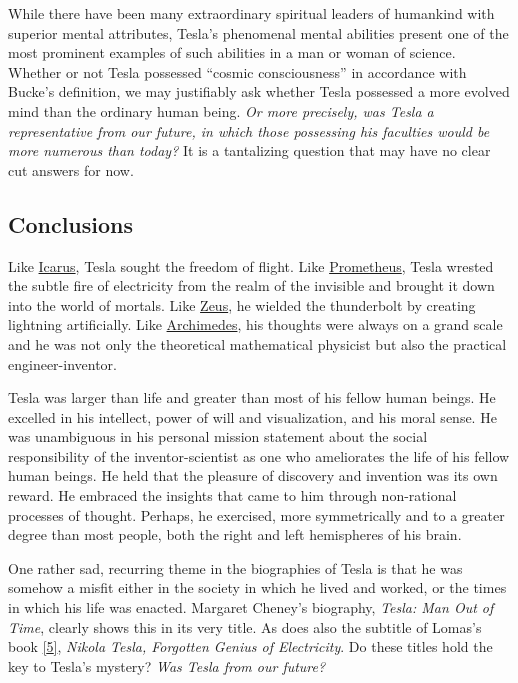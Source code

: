\documentclass[
  a4paper,
]{article}
\begin{document}
While there have been many extraordinary spiritual leaders of humankind
with superior mental attributes, Tesla's phenomenal mental abilities
present one of the most prominent examples of such abilities in a man or
woman of science. Whether or not Tesla possessed ``cosmic
consciousness'' in accordance with Bucke's definition, we may
justifiably ask whether Tesla possessed a more evolved mind than the
ordinary human being. \emph{Or more precisely, was Tesla a
representative from our future, in which those possessing his faculties
would be more numerous than today?} It is a tantalizing question that
may have no clear cut answers for now.

\hypertarget{conclusions}{%
\subsection{Conclusions}\label{conclusions}}

Like \href{https://en.wikipedia.org/wiki/Icarus}{Icarus}, Tesla sought
the freedom of flight. Like
\href{https://en.wikipedia.org/wiki/Prometheus}{Prometheus}, Tesla
wrested the subtle fire of electricity from the realm of the invisible
and brought it down into the world of mortals. Like
\href{https://en.wikipedia.org/wiki/Zeus}{Zeus}, he wielded the
thunderbolt by creating lightning artificially. Like
\href{https://en.wikipedia.org/wiki/Archimedes}{Archimedes}, his
thoughts were always on a grand scale and he was not only the
theoretical mathematical physicist but also the practical
engineer-inventor.

Tesla was larger than life and greater than most of his fellow human
beings. He excelled in his intellect, power of will and visualization,
and his moral sense. He was unambiguous in his personal mission
statement about the social responsibility of the inventor-scientist as
one who ameliorates the life of his fellow human beings. He held that
the pleasure of discovery and invention was its own reward. He embraced
the insights that came to him through non-rational processes of thought.
Perhaps, he exercised, more symmetrically and to a greater degree than
most people, both the right and left hemispheres of his brain.

One rather sad, recurring theme in the biographies of Tesla is that he
was somehow a misfit either in the society in which he lived and worked,
or the times in which his life was enacted. Margaret Cheney's biography,
\emph{Tesla: Man Out of Time}, clearly shows this in its very title. As
does also the subtitle of Lomas's book
\protect\hyperlink{ref-lomas99}{{[}5{]}}, \emph{Nikola Tesla, Forgotten
Genius of Electricity}. Do these titles hold the key to Tesla's mystery?
\emph{Was Tesla from our future?}
\end{document}
